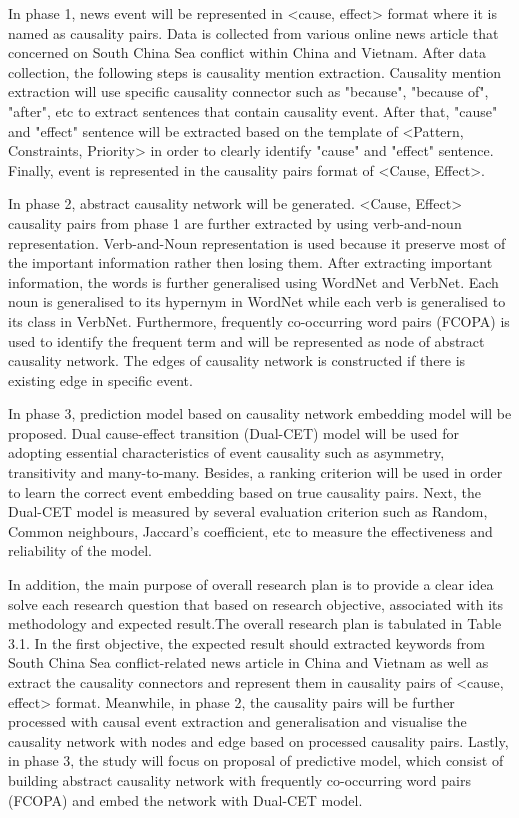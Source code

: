 \documentclass[twoside]{utmthesis}
\begin{document}
In phase 1, news event will be represented in <cause, effect> format where it is named as causality pairs. Data is collected from various online news article that concerned on South China Sea conflict within China and Vietnam. After data collection, the following steps is causality mention extraction. Causality mention extraction will use specific causality connector such as "because", "because of", "after", etc to extract sentences that contain causality event. After that, "cause" and "effect" sentence will be extracted based on the template of <Pattern, Constraints, Priority> in order to clearly identify "cause" and "effect" sentence. Finally, event is represented in the causality pairs format of <Cause, Effect>. 

In phase 2, abstract causality network will be generated. <Cause, Effect> causality pairs from phase 1 are further extracted by using verb-and-noun representation. Verb-and-Noun representation is used because it preserve most of the important information rather then losing them. After extracting important information, the words is further generalised using WordNet and VerbNet. Each noun is generalised to its hypernym in WordNet while each verb is generalised to its class in VerbNet. Furthermore, frequently co-occurring word pairs (FCOPA) is used to identify the frequent term and will be represented as node of abstract causality network. The edges of causality network is constructed if there is existing edge in specific event. 

In phase 3, prediction model based on causality network embedding model will be proposed. Dual cause-effect transition (Dual-CET) model will be used for adopting essential characteristics of event causality such as asymmetry, transitivity and many-to-many. Besides, a ranking criterion will be used in order to learn the correct event embedding based on true causality pairs. Next, the Dual-CET model is measured by several evaluation criterion such as Random, Common neighbours, Jaccard's coefficient, etc to measure the effectiveness and reliability of the model.  
  
In addition, the main purpose of overall research plan is to provide a clear idea solve each research question that based on research objective, associated with its methodology and expected result.The overall research plan is tabulated in Table 3.1. In the first objective, the expected result should extracted keywords from South China Sea conflict-related news article in China and Vietnam as well as extract the causality connectors and represent them in causality pairs of <cause, effect> format. Meanwhile, in phase 2, the causality pairs will be further processed with causal event extraction and generalisation and visualise the causality network with nodes and edge based on processed causality pairs. Lastly, in phase 3, the study will focus on proposal of predictive model, which consist of building abstract causality network with frequently co-occurring word pairs (FCOPA) and embed the network with Dual-CET model. 
\end{document}
